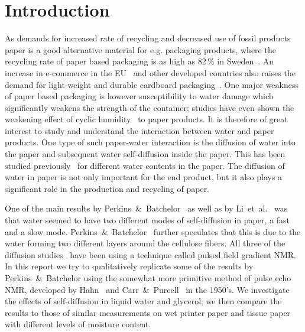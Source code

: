 \documentclass[11pt,a4paper, twocolumn,
swedish, english %
]{article}
\begin{document}




\section{Introduction}

As demands for increased rate of recycling and decreased use of fossil
products paper is a good alternative material for e.g. packaging
products, where the recycling rate of paper based packaging is as high
as 82\,\% in Sweden~\cite{Adolfson_NVV2016}. An increase in e-commerce
in the EU~\cite{eurostat_e-commerce2017} and other developed countries
also raises the demand for light-weight and durable cardboard
packaging~\cite{Nordstrand2003}. One major weakness of paper based 
packaging is however susceptibility to water damage which
significantly weakens the strength of the container; studies have even
shown the weakening effect of cyclic
humidity~\cite{Sorensen-Hoffmann2004} to paper products. It is 
therefore of great interest to study and understand the interaction
between water and paper products. 
One type of such paper-water interaction is the diffusion of water
into the paper and subsequent water self-diffusion inside the 
paper. This has been studied previously~\cite{Perkins-Batchelor2012,
  Li-etal1992, Topgaard-Soderman2001} for different water contents in
the paper. The diffusion of water in paper is not only important for
the end product, but it also plays a significant role in the
production and recycling of paper.

One of the main results by
Perkins~\&~Batchelor~\cite{Perkins-Batchelor2012} as well as by
Li~et~al.~\cite{Li-etal1992} was that water 
seemed to have two different modes of self-diffusion in paper, a fast
and a slow mode. Perkins~\&~Batchelor~\cite{Perkins-Batchelor2012}
further speculates that this is due to the water forming two different
layers around the cellulose fibers. All three of the diffusion
studies~\cite{Perkins-Batchelor2012, Li-etal1992,
  Topgaard-Soderman2001} have been using a technique called pulsed 
field gradient NMR. In this report we try to qualitatively replicate
some of the results by Perkins~\&~Batchelor using the
somewhat more primitive method of pulse echo NMR, developed by
Hahn~\cite{Hahn1950} and Carr~\&~Purcell~\cite{Carr-Purcell1954} in
the 1950's. We investigate the effects of self-diffusion in liquid
water and glycerol; we then compare the results to those of similar
measurements on wet printer paper and tissue paper with different
levels of moisture content. 
\end{document}
